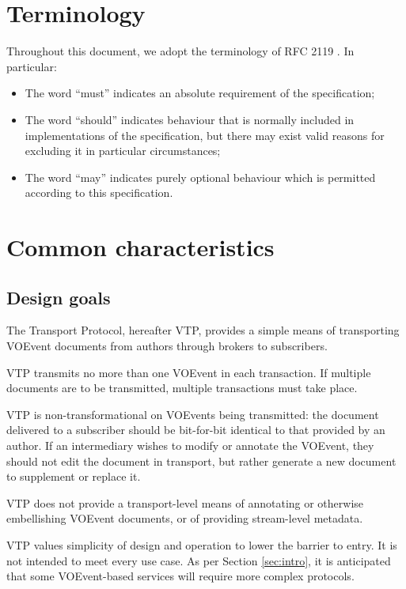 \documentclass[a4paper,11pt]{ivoa}
\begin{document}
\section{Terminology}

Throughout this document, we adopt the terminology of RFC 2119
\citep{Bradner:1997}. In particular:

\begin{itemize}
    \item{The word ``must'' indicates an absolute requirement of the
    specification;}

    \item{The word ``should'' indicates behaviour that is normally included in
    implementations of the specification, but there may exist valid reasons
    for excluding it in particular circumstances;}

    \item{The word ``may'' indicates purely optional behaviour which is
    permitted according to this specification.}
\end{itemize}

\section{Common characteristics}

\subsection{Design goals}
\label{sec:common:design}

The Transport Protocol, hereafter VTP, provides a simple means of transporting
VOEvent documents from authors through brokers to subscribers.

VTP transmits no more than one VOEvent in each transaction. If multiple
documents are to be transmitted, multiple transactions must take place.

VTP is non-transformational on VOEvents being transmitted: the document
delivered to a subscriber should be bit-for-bit identical to that provided by
an author. If an intermediary wishes to modify or annotate the VOEvent, they
should not edit the document in transport, but rather generate a new document
to supplement or replace it.

VTP does not provide a transport-level means of annotating or otherwise
embellishing VOEvent documents, or of providing stream-level metadata.

VTP values simplicity of design and operation to lower the barrier to entry. It
is not intended to meet every use case. As per Section \ref{sec:intro}, it is
anticipated that some VOEvent-based services will require more complex
protocols.
\end{document}

